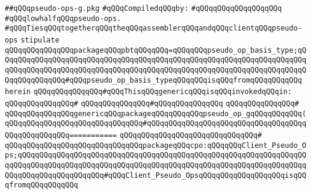 \label{src/lib/compiler/back/low/mcg/pseudo-op-g.pkg}
\verb|##qQQqpseudo-ops-g.pkg|\newline
\newline
\verb|#qQQqCompiledqQQqby:|\newline
\verb|#qQQqqQQqqQQqqQQqqQQq|\newline
\newline
\newline
\newline
\verb|#qQQqlowhalfqQQqpseudo-ops.|\newline
\verb|#qQQqTiesqQQqtogetherqQQqtheqQQqassemblerqQQqandqQQqclientqQQqpseudo-ops|\newline
\newline
\newline
\newline
\newline
\verb|stipulate|\newline
\verb|qQQqqQQqqQQqqQQqpackageqQQqpbtqQQqqQQq=qQQqqQQqpseudo_op_basis_type;qQQqqQQqqQQqqQQqqQQqqQQqqQQqqQQqqQQqqQQqqQQqqQQqqQQqqQQqqQQqqQQqqQQqqQQqqQQqqQQqqQQqqQQqqQQqqQQqqQQqqQQqqQQqqQQqqQQqqQQqqQQqqQQqqQQqqQQqqQQqqQQqqQQqqQQqqQQq#qQQqpseudo_op_basis_typeqQQqqQQqisqQQqfromqQQqqQQqqQQq|\newline
\verb|herein|\newline
\newline
\verb|qQQqqQQqqQQqqQQq#qQQqThisqQQqgenericqQQqisqQQqinvokedqQQqin:|\newline
\verb|qQQqqQQqqQQqqQQq#|\newline
\verb|qQQqqQQqqQQqqQQq#qQQqqQQqqQQqqQQq|\newline
\verb|qQQqqQQqqQQqqQQq#|\newline
\verb|qQQqqQQqqQQqqQQqgenericqQQqpackageqQQqqQQqqQQqpseudo_op_gqQQqqQQqqQQq(|\newline
\verb|qQQqqQQqqQQqqQQqqQQqqQQqqQQqqQQq#qQQqqQQqqQQqqQQqqQQqqQQqqQQqqQQqqQQqqQQqqQQqqQQqqQQq===========|\newline
\verb|qQQqqQQqqQQqqQQqqQQqqQQqqQQqqQQq#|\newline
\verb|qQQqqQQqqQQqqQQqqQQqqQQqqQQqqQQqpackageqQQqcpo:qQQqqQQqClient_Pseudo_Ops;qQQqqQQqqQQqqQQqqQQqqQQqqQQqqQQqqQQqqQQqqQQqqQQqqQQqqQQqqQQqqQQqqQQqqQQqqQQqqQQqqQQqqQQqqQQqqQQqqQQqqQQqqQQqqQQqqQQqqQQqqQQqqQQqqQQqqQQqqQQqqQQqqQQqqQQqqQQqqQQq#qQQqClient_Pseudo_OpsqQQqqQQqqQQqqQQqqQQqisqQQqfromqQQqqQQqqQQq|\newline

